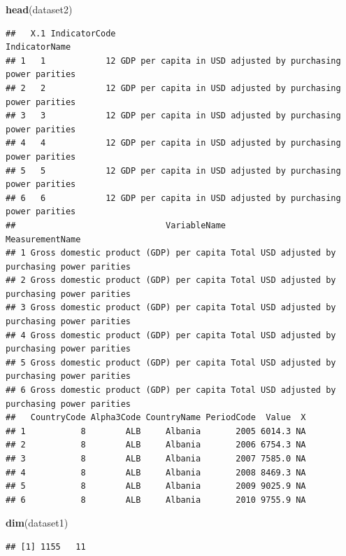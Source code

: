 \documentclass[
]{article}
\newenvironment{Shaded}{\begin{snugshade}}{\end{snugshade}}
\newcommand{\FunctionTok}[1]{\textcolor[rgb]{0.13,0.29,0.53}{\textbf{#1}}}
\newcommand{\NormalTok}[1]{#1}
\begin{document}
\begin{Shaded}
\begin{Highlighting}[]
\FunctionTok{head}\NormalTok{(dataset2)}
\end{Highlighting}
\end{Shaded}

\begin{verbatim}
##   X.1 IndicatorCode                                               IndicatorName
## 1   1            12 GDP per capita in USD adjusted by purchasing power parities
## 2   2            12 GDP per capita in USD adjusted by purchasing power parities
## 3   3            12 GDP per capita in USD adjusted by purchasing power parities
## 4   4            12 GDP per capita in USD adjusted by purchasing power parities
## 5   5            12 GDP per capita in USD adjusted by purchasing power parities
## 6   6            12 GDP per capita in USD adjusted by purchasing power parities
##                              VariableName                                 MeasurementName
## 1 Gross domestic product (GDP) per capita Total USD adjusted by purchasing power parities
## 2 Gross domestic product (GDP) per capita Total USD adjusted by purchasing power parities
## 3 Gross domestic product (GDP) per capita Total USD adjusted by purchasing power parities
## 4 Gross domestic product (GDP) per capita Total USD adjusted by purchasing power parities
## 5 Gross domestic product (GDP) per capita Total USD adjusted by purchasing power parities
## 6 Gross domestic product (GDP) per capita Total USD adjusted by purchasing power parities
##   CountryCode Alpha3Code CountryName PeriodCode  Value  X
## 1           8        ALB     Albania       2005 6014.3 NA
## 2           8        ALB     Albania       2006 6754.3 NA
## 3           8        ALB     Albania       2007 7585.0 NA
## 4           8        ALB     Albania       2008 8469.3 NA
## 5           8        ALB     Albania       2009 9025.9 NA
## 6           8        ALB     Albania       2010 9755.9 NA
\end{verbatim}

\begin{Shaded}
\begin{Highlighting}[]
\FunctionTok{dim}\NormalTok{(dataset1)}
\end{Highlighting}
\end{Shaded}

\begin{verbatim}
## [1] 1155   11
\end{verbatim}
\end{document}
